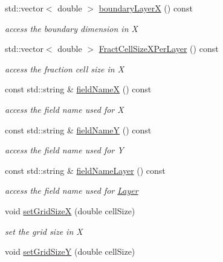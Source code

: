 \begin{DoxyCompactItemize}
std\+::vector$<$ double $>$ \hyperlink{class_d_d4hep_1_1_d_d_segmentation_1_1_tiled_layer_grid_x_y_ad02cf70affc62612a40583aaca30abd8}{boundary\+LayerX} () const
\begin{DoxyCompactList}\small\item\em access the boundary dimension in X \end{DoxyCompactList}\item 
std\+::vector$<$ double $>$ \hyperlink{class_d_d4hep_1_1_d_d_segmentation_1_1_tiled_layer_grid_x_y_a6fe003c4987365ae0eb58db4c5889f43}{Fract\+Cell\+Size\+X\+Per\+Layer} () const
\begin{DoxyCompactList}\small\item\em access the fraction cell size in X \end{DoxyCompactList}\item 
const std\+::string \& \hyperlink{class_d_d4hep_1_1_d_d_segmentation_1_1_tiled_layer_grid_x_y_a87f012e8aa8b1c486b1b06fcd9bae1c6}{field\+NameX} () const
\begin{DoxyCompactList}\small\item\em access the field name used for X \end{DoxyCompactList}\item 
const std\+::string \& \hyperlink{class_d_d4hep_1_1_d_d_segmentation_1_1_tiled_layer_grid_x_y_aec99e9725ef4ca55326a79c01feeb24f}{field\+NameY} () const
\begin{DoxyCompactList}\small\item\em access the field name used for Y \end{DoxyCompactList}\item 
const std\+::string \& \hyperlink{class_d_d4hep_1_1_d_d_segmentation_1_1_tiled_layer_grid_x_y_aff8aa3eacaf4502aa6eb21e53fdf46b0}{field\+Name\+Layer} () const
\begin{DoxyCompactList}\small\item\em access the field name used for \hyperlink{class_d_d4hep_1_1_layer}{Layer} \end{DoxyCompactList}\item 
void \hyperlink{class_d_d4hep_1_1_d_d_segmentation_1_1_tiled_layer_grid_x_y_a183f76f3765e6ab4985b0d6eb024785a}{set\+Grid\+SizeX} (double cell\+Size)
\begin{DoxyCompactList}\small\item\em set the grid size in X \end{DoxyCompactList}\item 
void \hyperlink{class_d_d4hep_1_1_d_d_segmentation_1_1_tiled_layer_grid_x_y_a2556a5e0000580a8ffdf93bde33c36b8}{set\+Grid\+SizeY} (double cell\+Size)

\end{DoxyCompactItemize}
